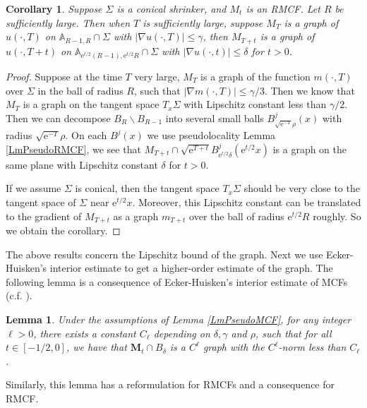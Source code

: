 \documentclass[12pt]{amsart}
\numberwithin{equation}{section}
\newtheorem{lemma}[theorem]{Lemma}
\newtheorem{corollary}[theorem]{Corollary}
\numberwithin{equation}{section}
\newcommand{\dt}{\delta}
\begin{document}
	\begin{corollary}\label{CorPseudo}
		Suppose $\Sigma$ is a conical shrinker, and $M_t$ is an RMCF. Let $R$ be sufficiently large. Then when $T$ is sufficiently large, suppose $M_T$ is a graph of $u(\cdot,T)$ on $\mathbb A_{R-1,R}\cap\Sigma$ with $|\nabla u(\cdot,T)|\leq \gamma$, then $M_{T+t}$ is a graph of $u(\cdot,T+t)$ on $\mathbb A_{\mathrm{e}^{t/2} (R-1),\mathrm{e}^{t/2}R}\cap\Sigma$ with $|\nabla u(\cdot,t)|\leq \delta$ for $t>0$.
	\end{corollary}
	\begin{proof}
		Suppose at the time $T$ very large, $M_T$ is a graph of the function $m(\cdot, T)$ over $\Sigma$ in the ball of radius $R$, such that $|\nabla m(\cdot, T)|\leq \gamma/3$. Then we know that $M_T$ is a graph on the tangent space $T_x\Sigma$ with Lipschitz constant less than $\gamma/2$. Then we can decompose $B_R\backslash B_{R-1}$ into several small balls $B^j_{\sqrt{\mathrm{e}^{-T}}\rho}(x)$ with radius $\sqrt{\mathrm{e}^{-T}}\rho$. On each $B^j(x)$ we use pseudolocality Lemma \ref{LmPseudoRMCF}, we see that $M_{T+t}\cap \sqrt{\mathrm{e}^{T+t}}B_{\mathrm{e}^{t/2}\delta}^j(\mathrm{e}^{t/2}x)$ is a graph on the same plane with Lipschitz constant $\delta$ for $t>0$.
		
		If we assume $\Sigma$ is conical, then the tangent space $T_x\Sigma$ should be very close to the tangent space of $\Sigma$ near $\mathrm{e}^{t/2}x$. Moreover, this Lipschitz constant can be translated to the gradient of $M_{T+t}$ as a graph $m_{T+t}$ over the ball of radius $\mathrm{e}^{t/2}R$ roughly. So we obtain the corollary.
	\end{proof}
	
	The above results concern the Lipschitz bound of the graph. Next we use Ecker-Huisken's interior estimate to get a higher-order estimate of the graph. The following lemma is a consequence of Ecker-Huisken's interior estimate of MCFs (c.f. \cite[Section 4]{EH}).
	
	\begin{lemma}\label{LmPseudoMCF-high}
		Under the assumptions of Lemma \ref{LmPseudoMCF}, for any integer $\ell>0$, there exists a constant $C_\ell$ depending on $\delta,\gamma$ and $\rho$, such that for all $t\in[-1/2,0]$, we have that $\mathbf{M}_t\cap B_\dt$ is a $C^\ell$ graph with the $C^\ell$-norm less than $C_\ell$.
	\end{lemma} 
	
	Similarly, this lemma has a reformulation for RMCFs and a consequence for RMCF.
	
\end{document}
